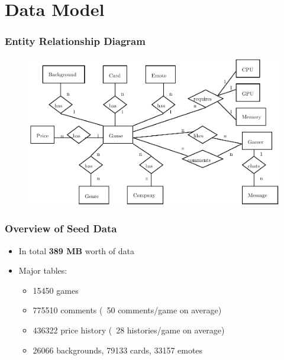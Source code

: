 \section{Data Model}
\begin{frame}
\frametitle{Entity Relationship Diagram}

\begin{figure}
	\includegraphics[scale=0.7]{erd.pdf}
\end{figure}

\end{frame}

\begin{frame}
\frametitle{Overview of Seed Data}
	\begin{itemize}
		\setlength\itemsep{1em}
		\item In total \textbf{389 MB} worth of data
		\item Major tables:
			\begin{itemize}
				\setlength\itemsep{1em}
				\item 15450 games
				\item 775510 comments (~50 comments/game on average)
				\item 436322 price history (~28 histories/game on average)
				\item 26066 backgrounds, 79133 cards, 33157 emotes
			\end{itemize}
	\end{itemize}
\end{frame}
